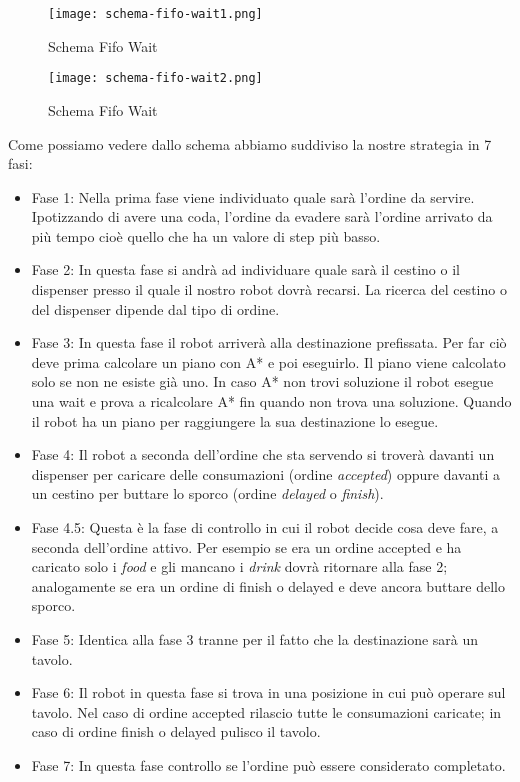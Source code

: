 \begin{figure}[htp]
  \texttt{[image: schema-fifo-wait1.png]}
  \caption{Schema Fifo Wait}
  \label{fig:figure1}
\end{figure}

\begin{figure}[htp]
  \texttt{[image: schema-fifo-wait2.png]}
  \caption{Schema Fifo Wait}
  \label{fig:figure2}
\end{figure}

Come possiamo vedere dallo schema abbiamo suddiviso la nostre strategia in 7 fasi:
\begin{itemize}
  \item Fase 1: Nella prima fase viene individuato quale sarà l'ordine da servire. Ipotizzando di avere una coda, l'ordine da evadere sarà l'ordine arrivato da più tempo cioè quello che ha un valore di step più basso.
  \item Fase 2: In questa fase si andrà ad individuare quale sarà il cestino o il dispenser presso il quale il nostro robot dovrà recarsi. La ricerca del cestino o del dispenser dipende dal tipo di ordine.
  \item Fase 3: In questa fase il robot arriverà alla destinazione prefissata. Per far ciò deve prima calcolare un piano con A* e poi eseguirlo. Il piano viene calcolato solo se non ne esiste già uno. In caso A* non trovi soluzione il robot esegue una wait e prova a ricalcolare A* fin quando non trova una soluzione. Quando il robot ha un piano per raggiungere la sua destinazione lo esegue.
  \item Fase 4: Il robot a seconda dell'ordine che sta servendo si troverà davanti un dispenser per caricare delle consumazioni (ordine \emph{accepted}) oppure davanti a un cestino per buttare lo sporco (ordine \emph{delayed} o \emph{finish}).
  \item Fase 4.5: Questa è la fase di controllo in cui il robot decide cosa deve fare, a seconda dell'ordine attivo. Per esempio se era un ordine accepted e ha caricato solo i \emph{food} e gli mancano i \emph{drink} dovrà ritornare alla fase 2; analogamente se era un ordine di finish o delayed e deve ancora buttare dello sporco.
  \item Fase 5: Identica alla fase 3 tranne per il fatto che la destinazione sarà un tavolo.
  \item Fase 6: Il robot in questa fase si trova in una posizione in cui può operare sul tavolo. Nel caso di ordine accepted rilascio tutte le consumazioni caricate; in caso di ordine finish o delayed pulisco il tavolo.
  \item Fase 7: In questa fase controllo se l'ordine può essere considerato completato.
\end{itemize}

